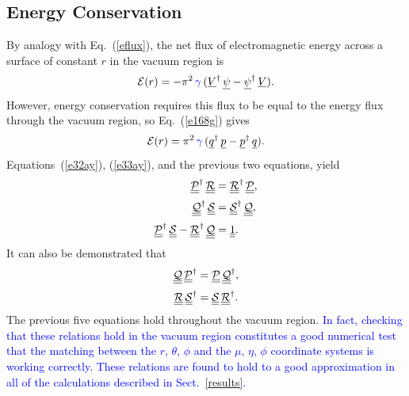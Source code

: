 \documentclass[12pt,prb,aps]{revtex4-1}
\begin{document}
\subsection{Energy Conservation}
By analogy with Eq.~(\ref{eflux}), the net flux of electromagnetic energy across a surface of constant $r$ in the vacuum region is
\begin{equation}
{\cal E}(r) = -\pi^2\,\textcolor{blue}{\gamma}\, (\underline{V}^\dag\,\underline{\psi}- \underline{\psi}^\dag\,\underline{V}).
\end{equation}
However, energy conservation requires this flux to be equal  to the energy flux through the vacuum region, so Eq.~(\ref{e168g}) gives
\begin{equation}\label{e39x}
{\cal E}(r) =\pi^2\,\textcolor{blue}{\gamma}\,(\underline{q}^\dag\,\underline{p}-\underline{p}^\dag\,\underline{q}).
\end{equation}
Equations~(\ref{e32ay}), (\ref{e33ay}), and the previous two equations, yield\,\cite{tj1}
\begin{align}\label{e41zx}
\underline{\underline{\cal P}}^\dag\,\underline{\underline{\cal R}}&= \underline{\underline{\cal R}}^\dag\,\underline{\underline{\cal P}},\\[0.5ex]
\underline{\underline{\cal Q}}^\dag\,\underline{\underline{\cal S}}&= \underline{\underline{\cal S}}^\dag\,\underline{\underline{\cal Q}},\label{e42zx}\\[0.5ex]
\underline{\underline{\cal P}}^\dag\,\underline{\underline{\cal S}}- \underline{\underline{\cal R}}^\dag\,\underline{\underline{\cal Q}}&=\underline{\underline{1}}.\label{e43zx}
\end{align}
 It can also be demonstrated that 
\begin{align}\label{e46}
\underline{\underline{\cal Q}}\,\underline{\underline{\cal P}}^\dag&= \underline{\underline{\cal P}}\,\underline{\underline{\cal Q}}^\dag,\\[0.5ex]
\underline{\underline{\cal R}}\,\underline{\underline{\cal S}}^\dag&= \underline{\underline{\cal S}}\,\underline{\underline{\cal R}}^\dag.\label{e47x}
\end{align}
The previous five equations hold throughout the vacuum region. \textcolor{blue}{In fact, checking that these relations hold in the vacuum region constitutes a good numerical
test that the matching between the $r$, $\theta$, $\phi$ and the $\mu$, $\eta$, $\phi$ coordinate systems is working correctly. These relations
are found to hold to a good approximation in all of the calculations described in Sect.~\ref{results}. }
\end{document}
